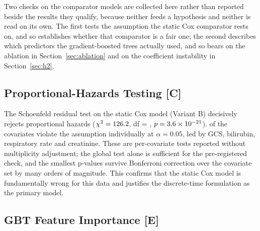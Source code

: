 Two checks on the comparator models are collected here rather than reported
beside the results they qualify, because neither feeds a hypothesis and neither
is read on its own. The first tests the assumption the static Cox comparator
rests on, and so establishes whether that comparator is a fair one; the second
describes which predictors the gradient-boosted trees actually used, and so
bears on the ablation in Section~\ref{sec:ablation} and on the coefficient
instability in Section~\ref{sec:h2}.

\subsection{Proportional-Hazards Testing \texorpdfstring{[C]}{[C]}}
\label{sec:schoenfeld}

The Schoenfeld residual test on the static Cox model (Variant B) decisively
rejects proportional hazards ($\chi^2 = 126.2$,
df = \pcSchoenfeldDf, $p = 3.6\times 10^{-21}$).
\pcSchoenfeldNViolate{} of the \pcSchoenfeldNCovariates{} covariates violate
the assumption individually at $\alpha = 0.05$, led by GCS, bilirubin,
respiratory rate and creatinine. These are per-covariate tests reported without
multiplicity adjustment; the global test alone is sufficient for the
pre-registered check, and the smallest p-values survive Bonferroni correction
over the covariate set by many orders of magnitude. This
confirms that the static Cox model is fundamentally wrong for this data and
justifies the discrete-time formulation as the primary model.

\subsection{GBT Feature Importance \texorpdfstring{[E]}{[E]}}
\label{sec:feature_importance}

